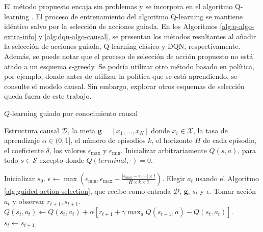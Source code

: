 

El método propuesto encaja sin problemas y se incorpora en el algoritmo Q-learning \cite{watkins1992q}. El proceso de entrenamiento 
 del algoritmo Q-learning se mantiene idéntico salvo por  la selección de acciones guiada.
En los Algoritmos
\ref{alg:q-algo-extra-info} y \ref{alg:dqn-algo-causal}, se presentan los métodos resultantes al añadir la selección de acciones guiada, Q-learning clásico y DQN, respectivamente. Además, se puede notar que el proceso de selección de acción propuesto no está atado a un esquema $\epsilon$-greedy. Se podría utilizar otro método basado en política, por ejemplo, donde antes de utilizar la política que se está aprendiendo, se consulte el modelo causal. Sin embargo, explorar otros esquemas de selección queda fuera de este trabajo.

\begin{mialgoritmo}[H]
  	\caption{$Q$-learning guiado por conocimiento causal}
	\label{alg:q-algo-extra-info}
  \begin{algorithmic}[1]
  \REQUIRE Estructura causal $\mathcal{D}$, la meta $\mathbf{g} = [x_1, \dots, x_N]$ donde $x_i \in \mathcal{X}$, la tasa de aprendizaje $\alpha \in (0,1]$, el número de episodios $k$, el horizonte $H$ de cada episodio, el coeficiente $\delta$, los valores $\epsilon_{\max}$ y $\epsilon_{\min}$.
  \STATE Inicializar arbitrariamente $Q(s,a)$, para todo $s\in \mathcal{S}$ excepto donde $Q(terminal, \cdot) = 0$.
  
    \STATE Inicializar $s_0$.
    \STATE $\epsilon \leftarrow \max(\epsilon_{\min}, \epsilon_{\max} - \frac{|\epsilon_{\max} - \epsilon_{\min}| \times t}{H \times k \times \delta})$.
    \STATE Elegir $a_t$ usando el Algoritmo \ref{alg:guided-action-selection}, que recibe como entrada $\mathcal{D}$, $\mathbf{g}$, $s_t$ y $\epsilon$.
    \STATE Tomar acción $a_t$ y observar $r_{t+1}, s_{t+1}$.
    \STATE $Q(s_t, a_t) \leftarrow Q(s_t, a_t) + \alpha [r_{t+1} + \gamma \max_a Q(s_{t+1}, a) - Q(s_t, a_t)]$.
    \STATE $s_t \leftarrow s_{t+1}$.
    \ENDFOR
  \ENDFOR
  \end{algorithmic}
\end{mialgoritmo}


